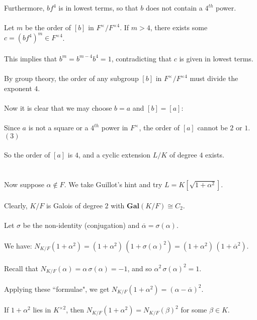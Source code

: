 \documentclass{article}
\begin{document}
\indent Furthermore, $bf^4$ is in lowest terms, so that $b$ does not contain a $4^{th}$ power. \\\\
\indent Let $m$ be the order of $[b]$ in $F^\times/F^{\times4}$.  If $m > 4$,  there exists some $c = (bf^{4})^m \in F^{\times 4}$. \\\\
\indent This implies that $b^m = b^{m-4}b^4 = 1$, contradicting that $c$ is given in lowest terms. \\\\
By group theory, the order of any subgroup $[b]$ in $F^\times/F^{\times4}$ must divide the exponent $4$. \\\\
Now it is clear that we may choose $b = a$ and $[b] = [a]$: \\\\
Since $a$ is not a square or a $4^{th}$ power in $F^\times$, the order of $[a]$ cannot be $2$ or $1$. $(3)$ \\\\
So the order of $[a]$ is $4$, and a cyclic extension $L/K$ of degree $4$ exists. \\\\
\\
Now suppose $\alpha \notin F$. We take Guillot's hint and try $L = K[\sqrt{1+\alpha^2}]$. \\\\
Clearly, $K/F$ is Galois of degree $2$ with $\textbf{Gal}(K/F) \cong C_2$. \\\\
Let $\sigma$ be the non-identity (conjugation) and $\overline{\alpha} = \sigma(\alpha)$. \\\\
We have: $N_{K/F}(1 + \alpha^2) = (1 + \alpha^2) \, (1 + \sigma(\alpha)^2) = (1 + \alpha^2) \, (1 + \overline{\alpha}^2).$ \\\\
Recall that $N_{K/F}(\alpha) = \alpha \, \sigma(\alpha) = -1$, and so $\alpha^2 \, \sigma(\alpha)^2 = 1$. \\\\
Applying these ``formulae", we get $N_{K/F}(1 + \alpha^2) = (\alpha - \overline{\alpha})^2$. \\\\
If $1 + \alpha^2$ lies in $K^{\times2}$, then $N_{K/F}(1 + \alpha^2) = N_{K/F}(\beta)^2$ for some $\beta \in K$. \\\\
\end{document}
